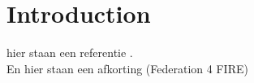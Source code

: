 \chapter{Introduction}

hier staan een referentie \cite{einstein}. \\

En hier staan een afkorting (Federation 4 FIRE)





